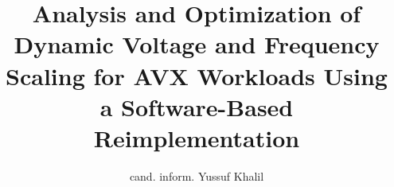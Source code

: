 
\title{Analysis and Optimization of Dynamic Voltage and Frequency Scaling for AVX Workloads Using a Software-Based Reimplementation}
\author{cand. inform. Yussuf Khalil}

\maketitle